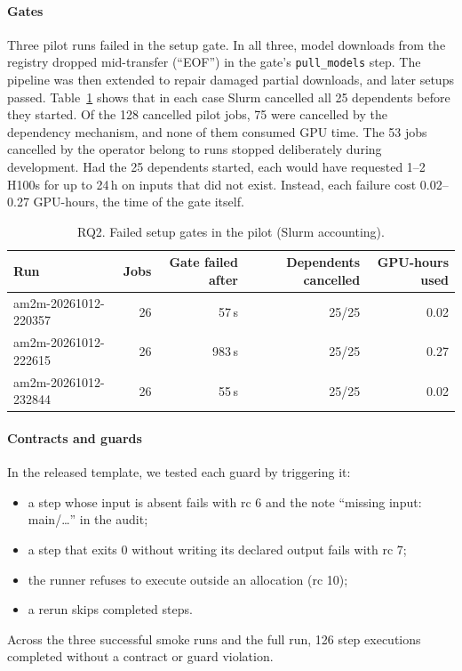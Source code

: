 \documentclass[pdflatex,sn-mathphys-num]{sn-jnl}
\theoremstyle{thmstyleone}%
\theoremstyle{thmstyletwo}%
\theoremstyle{thmstylethree}%
\newcommand{\code}[1]{\texttt{#1}}
\begin{document}
\paragraph{Gates} Three pilot runs failed in the setup gate. In all three,
model downloads from the registry dropped mid-transfer (``EOF'') in the
gate's \code{pull\_models} step. The pipeline was then extended to repair
damaged partial downloads, and later setups passed.
Table~\ref{tab:gates} shows that in each case Slurm cancelled all 25
dependents before they started. Of the 128 cancelled pilot jobs, 75 were
cancelled by the dependency mechanism, and none of them consumed GPU time. The
53 jobs cancelled by the operator belong to runs stopped deliberately during
development. Had the 25 dependents started, each would have requested 1--2
H100s for up to 24\,h on inputs that did not exist. Instead, each failure cost
0.02--0.27 GPU-hours, the time of the gate itself.

\begin{table}[t]
\centering\small
\caption{RQ2. Failed setup gates in the pilot (Slurm accounting).}\label{tab:gates}
\begin{tabular}{@{}l r r r r@{}}
\toprule
Run & Jobs & Gate failed after & Dependents cancelled & GPU-hours used \\
\midrule
am2m-20261012-220357 & 26 & 57\,s & 25/25 & 0.02 \\
am2m-20261012-222615 & 26 & 983\,s & 25/25 & 0.27 \\
am2m-20261012-232844 & 26 & 55\,s & 25/25 & 0.02 \\
\bottomrule
\end{tabular}
\end{table}

\paragraph{Contracts and guards} In the released template, we tested each
guard by triggering it:
\begin{itemize}[leftmargin=1.4em, itemsep=1pt]
\item a step whose input is absent fails with rc 6 and the note ``missing
input: main/\dots'' in the audit;
\item a step that exits 0 without writing its declared output fails with rc 7;
\item the runner refuses to execute outside an allocation (rc 10);
\item a rerun skips completed steps.
\end{itemize}
Across the three successful smoke runs and the full run, 126 step executions
completed without a contract or guard violation.
\end{document}
